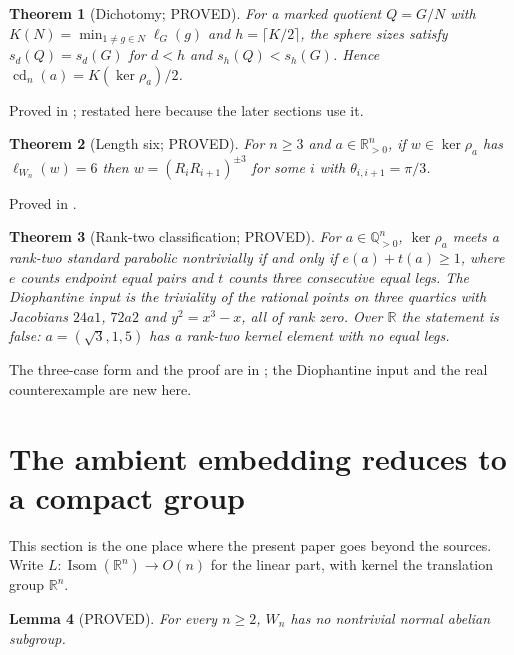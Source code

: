 \documentclass[11pt]{article}
\newtheorem{theorem}{Theorem}[section]
\newtheorem{lemma}[theorem]{Lemma}
\theoremstyle{definition}
\theoremstyle{remark}
\theoremstyle{definition}
\newcommand{\Q}{\mathbb{Q}}
\newcommand{\R}{\mathbb{R}}
\newcommand{\Isom}{\operatorname{Isom}}
\newcommand{\cd}{\operatorname{cd}}
\begin{document}
\begin{theorem}[Dichotomy; PROVED]\label{thm:dichotomy}
For a marked quotient $Q=G/N$ with $K(N)=\min_{1\ne g\in N}\ell_G(g)$ and $h=\lceil K/2\rceil$,
the sphere sizes satisfy $s_d(Q)=s_d(G)$ for $d<h$ and $s_h(Q)<s_h(G)$. Hence
$\cd_n(a)=K(\ker\rho_a)/2$.
\end{theorem}

\noindent Proved in \cite{orthoscheme}; restated here because the later sections use it.

\begin{theorem}[Length six; PROVED]\label{thm:len6}
For $n\ge3$ and $a\in\R_{>0}^n$, if $w\in\ker\rho_a$ has $\ell_{W_n}(w)=6$ then
$w=(R_iR_{i+1})^{\pm3}$ for some $i$ with $\theta_{i,i+1}=\pi/3$.
\end{theorem}

\noindent Proved in \cite{orthoscheme}.

\begin{theorem}[Rank-two classification; PROVED]\label{thm:rank2}
For $a\in\Q_{>0}^n$, $\ker\rho_a$ meets a rank-two standard parabolic nontrivially if and only if
$e(a)+t(a)\ge1$, where $e$ counts endpoint equal pairs and $t$ counts three consecutive equal
legs. The Diophantine input is the triviality of the rational points on three quartics with
Jacobians $24a1$, $72a2$ and $y^2=x^3-x$, all of rank zero. Over $\R$ the statement is false:
$a=(\sqrt3,1,5)$ has a rank-two kernel element with no equal legs.
\end{theorem}

\noindent The three-case form and the proof are in \cite{orthoscheme}; the Diophantine input and the real counterexample are new here.

\section{The ambient embedding reduces to a compact group}\label{sec:reduce}

This section is the one place where the present paper goes beyond the sources. Write
$L\colon\Isom(\R^n)\to O(n)$ for the linear part, with kernel the translation group $\R^n$.

\begin{lemma}[PROVED]\label{lem:noab}
For every $n\ge2$, $W_n$ has no nontrivial normal abelian subgroup.
\end{lemma}
\end{document}
